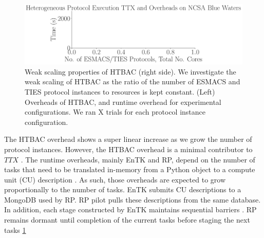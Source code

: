 \begin{figure}
  \centering
    \includegraphics[width=\columnwidth]{figures/esmacs_ties_ws_pseudo.pdf}
    \caption{Weak scaling properties of HTBAC (right side). We investigate
    the weak scaling of HTBAC as the ratio of the number of ESMACS and TIES
    protocol instances to resources is kept constant. (Left) Overheads of
    HTBAC, and runtime overhead for experimental configurations. We ran X
    trials for each protocol instance configuration.}
\label{fig:weak_scaling_ESMACS_TIES}
\end{figure}

The HTBAC overhead shows a super linear increase as we grow the number of
protocol instances. However, the HTBAC overhead is a minimal contributor to
\(TTX\) . The runtime overheads, mainly EnTK and RP, depend on the
number of tasks that need to be translated in-memory from a Python object to
a compute unit (CU) description . As such, those
overheads are expected to grow proportionally to the number of tasks. EnTK
submits CU descriptions to a MongoDB used by RP. RP pilot pulls these
descriptions from the same database.
In addition, each stage constructed by EnTK maintains sequential barriers
. RP remains dormant until
completion of the current tasks before staging the next tasks
\ref{fig:weak_scaling_ESMACS_TIES} 



